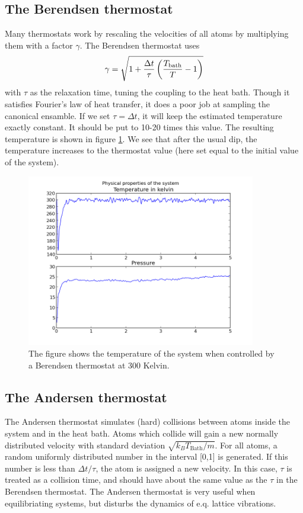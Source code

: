 \documentclass[12pt]{article}
\begin{document}
\subsection{The Berendsen thermostat}
Many thermostats work by rescaling the velocities of all atoms by multiplying them with a factor $\gamma$. The Berendsen thermostat uses 
\begin{equation}
 \gamma = \sqrt{1 + {\Delta t \over \tau}\left( {T_\text{bath} \over T}  - 1 \right)}
\end{equation}
with $\tau$ as the relaxation time, tuning the coupling to the heat bath. Though it satisfies Fourier's law of heat transfer, it does a poor job at sampling the canonical ensamble. If we set $\tau = \Delta t$, it will keep the estimated temperature exactly constant. It should be put to 10-20 times this value. The resulting temperature is shown in figure \ref{fig:12}. We see that after the usual dip, the temperature increases to the thermostat value (here set equal to the initial value of the system).

  \begin{figure}
\centering
\includegraphics[width=10cm]{berendsenthermostat.png}
\caption{\label{fig:12} The figure shows the temperature of the system when controlled by a Berendsen thermostat at 300 Kelvin.}
\end{figure}

\subsection{The Andersen thermostat}
The Andersen thermostat simulates (hard) collisions between atoms inside the system and in the heat bath. Atoms which collide will gain a new normally distributed velocity with standard deviation $\sqrt{k_B T_\text{Bath}/m}$. For all atoms, a random uniformly distributed number in the interval [0,1] is generated. If this number is less than $\Delta t / \tau$, the atom is assigned a new velocity. In this case, $\tau$ is treated as a collision time, and should have about the same value as the $\tau$ in the Berendsen thermostat. The Andersen thermostat is very useful when equilibriating systems, but disturbs the dynamics of e.q. lattice vibrations.
\end{document}
